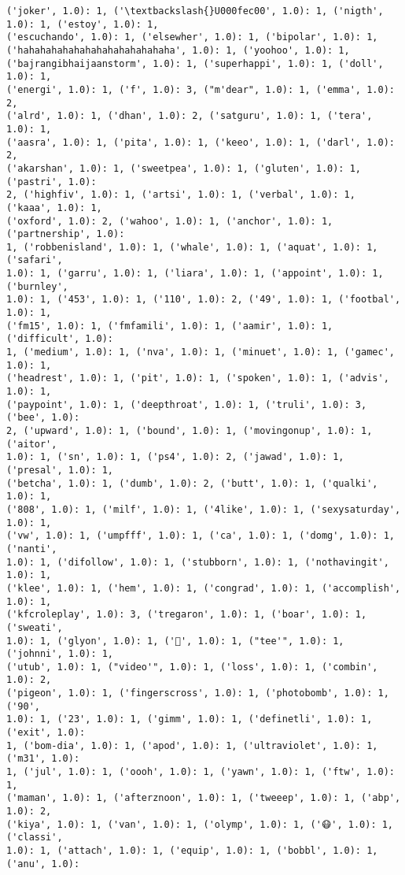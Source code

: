 \documentclass[11pt]{article}
\begin{document}
\begin{Verbatim}[commandchars=\\\{\}]
('joker', 1.0): 1, ('\textbackslash{}U000fec00', 1.0): 1, ('nigth', 1.0): 1, ('estoy', 1.0): 1,
('escuchando', 1.0): 1, ('elsewher', 1.0): 1, ('bipolar', 1.0): 1,
('hahahahahahahahahahahahahaha', 1.0): 1, ('yoohoo', 1.0): 1,
('bajrangibhaijaanstorm', 1.0): 1, ('superhappi', 1.0): 1, ('doll', 1.0): 1,
('energi', 1.0): 1, ('f', 1.0): 3, ("m'dear", 1.0): 1, ('emma', 1.0): 2,
('alrd', 1.0): 1, ('dhan', 1.0): 2, ('satguru', 1.0): 1, ('tera', 1.0): 1,
('aasra', 1.0): 1, ('pita', 1.0): 1, ('keeo', 1.0): 1, ('darl', 1.0): 2,
('akarshan', 1.0): 1, ('sweetpea', 1.0): 1, ('gluten', 1.0): 1, ('pastri', 1.0):
2, ('highfiv', 1.0): 1, ('artsi', 1.0): 1, ('verbal', 1.0): 1, ('kaaa', 1.0): 1,
('oxford', 1.0): 2, ('wahoo', 1.0): 1, ('anchor', 1.0): 1, ('partnership', 1.0):
1, ('robbenisland', 1.0): 1, ('whale', 1.0): 1, ('aquat', 1.0): 1, ('safari',
1.0): 1, ('garru', 1.0): 1, ('liara', 1.0): 1, ('appoint', 1.0): 1, ('burnley',
1.0): 1, ('453', 1.0): 1, ('110', 1.0): 2, ('49', 1.0): 1, ('footbal', 1.0): 1,
('fm15', 1.0): 1, ('fmfamili', 1.0): 1, ('aamir', 1.0): 1, ('difficult', 1.0):
1, ('medium', 1.0): 1, ('nva', 1.0): 1, ('minuet', 1.0): 1, ('gamec', 1.0): 1,
('headrest', 1.0): 1, ('pit', 1.0): 1, ('spoken', 1.0): 1, ('advis', 1.0): 1,
('paypoint', 1.0): 1, ('deepthroat', 1.0): 1, ('truli', 1.0): 3, ('bee', 1.0):
2, ('upward', 1.0): 1, ('bound', 1.0): 1, ('movingonup', 1.0): 1, ('aitor',
1.0): 1, ('sn', 1.0): 1, ('ps4', 1.0): 2, ('jawad', 1.0): 1, ('presal', 1.0): 1,
('betcha', 1.0): 1, ('dumb', 1.0): 2, ('butt', 1.0): 1, ('qualki', 1.0): 1,
('808', 1.0): 1, ('milf', 1.0): 1, ('4like', 1.0): 1, ('sexysaturday', 1.0): 1,
('vw', 1.0): 1, ('umpfff', 1.0): 1, ('ca', 1.0): 1, ('domg', 1.0): 1, ('nanti',
1.0): 1, ('difollow', 1.0): 1, ('stubborn', 1.0): 1, ('nothavingit', 1.0): 1,
('klee', 1.0): 1, ('hem', 1.0): 1, ('congrad', 1.0): 1, ('accomplish', 1.0): 1,
('kfcroleplay', 1.0): 3, ('tregaron', 1.0): 1, ('boar', 1.0): 1, ('sweati',
1.0): 1, ('glyon', 1.0): 1, ('🚮', 1.0): 1, ("tee'", 1.0): 1, ('johnni', 1.0): 1,
('utub', 1.0): 1, ("video'", 1.0): 1, ('loss', 1.0): 1, ('combin', 1.0): 2,
('pigeon', 1.0): 1, ('fingerscross', 1.0): 1, ('photobomb', 1.0): 1, ('90',
1.0): 1, ('23', 1.0): 1, ('gimm', 1.0): 1, ('definetli', 1.0): 1, ('exit', 1.0):
1, ('bom-dia', 1.0): 1, ('apod', 1.0): 1, ('ultraviolet', 1.0): 1, ('m31', 1.0):
1, ('jul', 1.0): 1, ('oooh', 1.0): 1, ('yawn', 1.0): 1, ('ftw', 1.0): 1,
('maman', 1.0): 1, ('afterznoon', 1.0): 1, ('tweeep', 1.0): 1, ('abp', 1.0): 2,
('kiya', 1.0): 1, ('van', 1.0): 1, ('olymp', 1.0): 1, ('😷', 1.0): 1, ('classi',
1.0): 1, ('attach', 1.0): 1, ('equip', 1.0): 1, ('bobbl', 1.0): 1, ('anu', 1.0):

\end{Verbatim}
\end{document}
